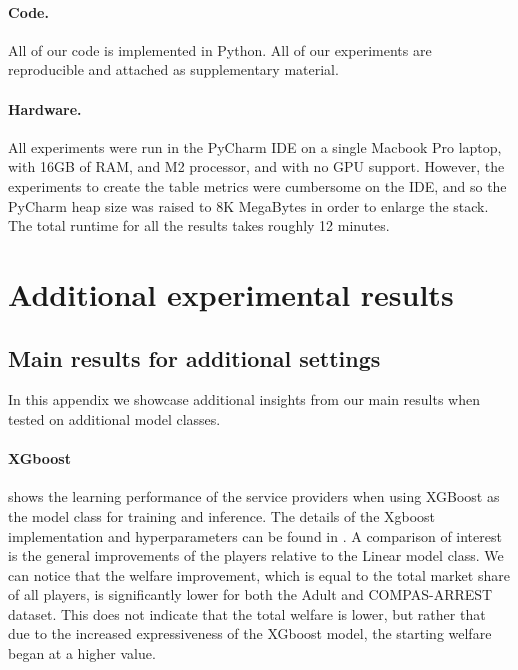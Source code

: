 \paragraph{Code.} All of our code is implemented in Python. All of our experiments are reproducible and attached as supplementary material.
\paragraph{Hardware.} All experiments were run in the PyCharm IDE on a single Macbook Pro laptop, with 16GB of RAM, and M2 processor, and with no GPU support. However, the experiments to create the table metrics  were cumbersome on the IDE, and so the PyCharm heap size was raised to 8K MegaBytes in order to enlarge the stack.
The total runtime for all the results takes roughly 12 minutes.

\section{Additional experimental results} \label{appx:add_exps}

\subsection{Main results for additional settings} \label{appx:tables}

In this appendix we showcase additional insights from our main results when tested on additional model classes.

\paragraph{XGboost}

 shows the learning performance of the service providers when using XGBoost as the model class for training and inference.
The details of the Xgboost implementation and hyperparameters can be found in .
A comparison of interest is the general improvements of the players relative to the Linear model class. We can notice that the welfare improvement, which is equal to the total market share of all players, is significantly lower for both the Adult and COMPAS-ARREST dataset.
This does not indicate that the total welfare is lower, but rather that due to the increased expressiveness of the XGboost model, the starting welfare began at a higher value.

